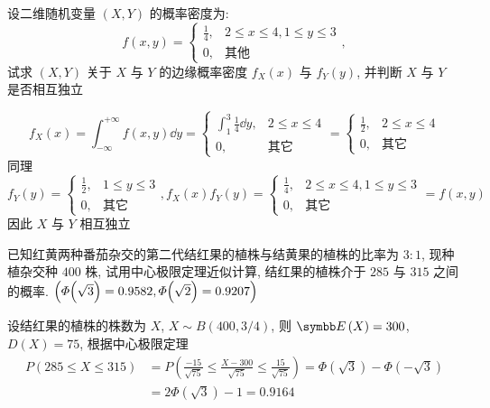 \begin{ti}[$10$ 分]
	设二维随机变量 $(X,Y)$ 的概率密度为:
	\begin{equation*}
		f(x,y)=
		\begin{cases}
		\frac{1}{4}, & 2\leqslant x\leq4,1\leqslant y\leq3\\
		0, & \text{其他}
		\end{cases},
	\end{equation*}
	试求 $(X,Y)$ 关于 $X$ 与 $Y$ 的边缘概率密度 $f_X(x)$ 与 $f_Y(y)$, 并判断 $X$ 与 $Y$ 是否相互独立
	\begin{solution}
		\[
		f_X(x)=\int_{-\infty}^{+\infty}f(x,y)\dd y=
		\begin{cases}
		\int_{1}^{3}\frac{1}{4}\dd y, & 2\leqslant x\leq4\\
		0, & \text{其它}
		\end{cases}=\begin{cases}
		\frac{1}{2}, & 2\leqslant x\leq4\\
		0, & \text{其它}
		\end{cases}
		\]
		同理
		\[
		f_Y(y)=
		\begin{cases}
		\frac{1}{2}, & 1\leqslant y\leq3\\
		0, & \text{其它}
		\end{cases},
		f_X(x)f_Y(y)=
		\begin{cases}
		\frac{1}{4}, & 2\leqslant x\leq4,1\leqslant y\leqslant 3\\
		0, & \text{其它}
		\end{cases}=f(x,y)
		\]
		因此 $X$ 与 $Y$ 相互独立
	\end{solution}
\end{ti}

\begin{ti}[$10$ 分]
	已知红黄两种番茄杂交的第二代结红果的植株与结黄果的植株的比率为 $3:1$, 现种植杂交种 $400$ 株, 试用中心极限定理近似计算, 结红果的植株介于 $285$ 与 $315$ 之间的概率. $\Bigl(\varPhi\Bigl(\sqrt{3}\Bigr)=0.9582,\allowbreak\varPhi\Bigl(\sqrt{2}\Bigr)=0.9207\Bigr)$
	\begin{solution}
		设结红果的植株的株数为 $X$, $X\sim B(400,3/4)$, 则 $\EE(X)=300$, $D(X)=75$, 根据中心极限定理
			\begin{align*}
			 P(285\leqslant X\leqslant 315)&=P\left(\frac{-15}{\sqrt{75}}\leq\frac{X-300}{\sqrt{75}}\leq\frac{15}{\sqrt{75}}\right)=\varPhi\left(\sqrt{3}\right)-\varPhi\left(-\sqrt{3}\right)\\
			&=2\varPhi\left(\sqrt{3}\right)-1=0.9164
			\end{align*}
	\end{solution}
\end{ti}

